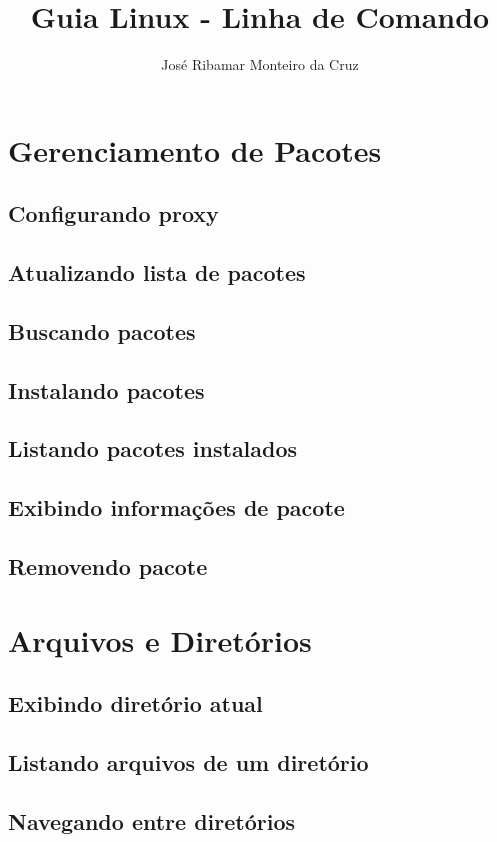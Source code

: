 \documentclass[a4paper,10pt]{article}
\begin{document}
\title{Guia Linux - Linha de Comando}
\author{José Ribamar Monteiro da Cruz}
\maketitle
\tableofcontents

\section{Gerenciamento de Pacotes}
\subsection{Configurando proxy}
\subsection{Atualizando lista de pacotes}
\subsection{Buscando pacotes}
\subsection{Instalando pacotes}
\subsection{Listando pacotes instalados}
\subsection{Exibindo informações de pacote}
\subsection{Removendo pacote}
 
\section{Arquivos e Diretórios}
\subsection{Exibindo diretório atual}
\subsection{Listando arquivos de um diretório}
\subsection{Navegando entre diretórios}
\end{document}
